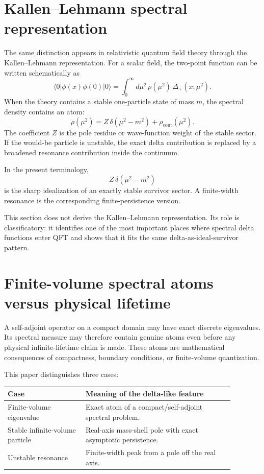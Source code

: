 \documentclass[11pt]{article}
\begin{document}
\section{Kallen--Lehmann spectral representation}

The same distinction appears in relativistic quantum field theory through the Kallen--Lehmann representation. For a scalar field, the two-point function can be written schematically as
\[
\langle 0|\phi(x)\phi(0)|0\rangle
=
\int_0^\infty d\mu^2\,\rho(\mu^2)\,\Delta_+(x;\mu^2).
\]
When the theory contains a stable one-particle state of mass \(m\), the spectral density contains an atom:
\[
\rho(\mu^2)
=
Z\,\delta(\mu^2-m^2)
+
\rho_{\mathrm{cont}}(\mu^2).
\]
The coefficient \(Z\) is the pole residue or wave-function weight of the stable sector. If the would-be particle is unstable, the exact delta contribution is replaced by a broadened resonance contribution inside the continuum.

In the present terminology,
\[
Z\,\delta(\mu^2-m^2)
\]
is the sharp idealization of an exactly stable survivor sector. A finite-width resonance is the corresponding finite-persistence version.

\begin{remark}
This section does not derive the Kallen--Lehmann representation. Its role is classificatory: it identifies one of the most important places where spectral delta functions enter QFT and shows that it fits the same delta-as-ideal-survivor pattern.
\end{remark}

\section{Finite-volume spectral atoms versus physical lifetime}

A self-adjoint operator on a compact domain may have exact discrete eigenvalues. Its spectral measure may therefore contain genuine atoms even before any physical infinite-lifetime claim is made. These atoms are mathematical consequences of compactness, boundary conditions, or finite-volume quantization.

This paper distinguishes three cases:
\begin{center}
\begin{tabular}{p{0.30\linewidth}p{0.58\linewidth}}
\hline
Case & Meaning of the delta-like feature\\
\hline
Finite-volume eigenvalue & Exact atom of a compact/self-adjoint spectral problem.\\
Stable infinite-volume particle & Real-axis mass-shell pole with exact asymptotic persistence.\\
Unstable resonance & Finite-width peak from a pole off the real axis.\\
\hline
\end{tabular}
\end{center}
\end{document}
